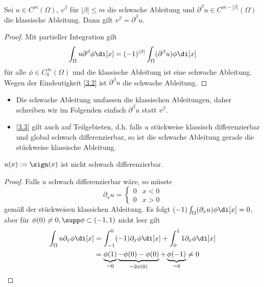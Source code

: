 \begin{st} \label{3.3}
	Sei $u \in C^m(\Omega)$, $v^\beta$ für $|\beta| \le m$ die schwache Ableitung und $\partial^\beta u \in C^{m-|\beta|}(\Omega)$ die klassische Ableitung.
	Dann gilt $v^\beta = \partial^\beta u$.
	\begin{proof}
		Mit partieller Integration gilt
		\[
			\int_\Omega u \partial^\beta \phi \di[x]
			= (-1)^{|\beta|} \int_\Omega (\partial^\beta u) \phi \di[x]
		\]
		für alle $\phi \in C_0^\infty(\Omega)$ und die klassische Ableitung ist eine schwache Ableitung.
		Wegen der Eindeutigkeit \ref{3.2} ist $\partial^\beta u$ die schwache Ableitung.
	\end{proof}
	\begin{note}
		\begin{itemize}
			\item
				Die schwache Ableitung umfassen die klassischen Ableitungen, daher schreiben wir im Folgenden einfach $\partial^\beta u$ statt $v^\beta$.
			\item
				\ref{3.3} gilt auch auf Teilgebieten, d.h. falls $u$ stückweise klassisch differenzierbar und global schwach differenzierbar, so ist die schwache Ableitung gerade die stückweise klassische Ableitung.
		\end{itemize}
	\end{note}
\end{st}

\begin{ex*}
	$u(x) := \sign(x)$ ist nicht schwach differenzierbar.
	\begin{proof}
		Falls $u$ schwach differenzierbar wäre, so müsste
		\[
			\partial_x u = \begin{cases}
				0 & x < 0 \\
				0 & x > 0
			\end{cases}
		\]
		gemäß der stückweisen klassichen Ableitung.
		Es folgt $(-1)\int_\Omega (\partial_x u) \phi \di[x] = 0$, aber für $\phi(0) \neq 0, \supp \phi \subset (-1,1)$ nicht leer gilt
		\begin{align*}
			\int_\Omega u \partial_x \phi \di[x]
			&= \int_{-1}^0 (-1) \partial_x \phi \di[x] + \int_0^1 1 \partial_x \phi \di[x] \\
			&= \underbrace{\phi(1)}_{=0} \underbrace{- \phi(0) - \phi(0)}_{= 2 \phi(0)} + \underbrace{\phi(-1) }_{=0}
			\neq 0
		\end{align*}
	\end{proof}
\end{ex*}

